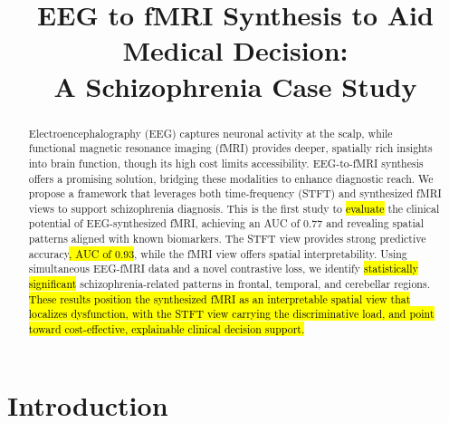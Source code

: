 \documentclass{article}
\date{}
\title{EEG to fMRI Synthesis to Aid Medical Decision:\\ A Schizophrenia Case Study}
\author{}
\begin{document}
\maketitle

\begin{abstract}
Electroencephalography (EEG) captures neuronal activity at the scalp, while functional magnetic resonance imaging (fMRI) provides deeper, spatially rich insights into brain function, though its high cost limits accessibility. EEG-to-fMRI synthesis offers a promising solution, bridging these modalities to enhance diagnostic reach. We propose a framework that leverages both time-frequency (STFT) and synthesized fMRI views to support schizophrenia diagnosis. This is the first study to \hl{evaluate} the clinical potential of EEG-synthesized fMRI, achieving an AUC of $0.77$ and revealing spatial patterns aligned with known biomarkers. The STFT view provides strong predictive accuracy\hl{, AUC of 0.93}, while the fMRI view offers spatial interpretability. Using simultaneous EEG-fMRI data and a novel contrastive loss, we identify \hl{statistically significant} schizophrenia-related patterns in frontal, temporal, and cerebellar regions. \hl{These results position the synthesized fMRI as an interpretable spatial view that localizes dysfunction, with the STFT view carrying the discriminative load, and point toward cost-effective, explainable clinical decision support.}
\end{abstract}

\section{Introduction}\label{section:introduction}
\end{document}
